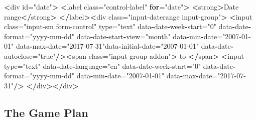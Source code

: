 \documentclass[]{article}
\newenvironment{Shaded}{\begin{snugshade}}{\end{snugshade}}
\newcommand{\ControlFlowTok}[1]{\textcolor[rgb]{0.13,0.29,0.53}{\textbf{#1}}}
\newcommand{\ErrorTok}[1]{\textcolor[rgb]{0.64,0.00,0.00}{\textbf{#1}}}
\newcommand{\NormalTok}[1]{#1}
\newcommand{\OperatorTok}[1]{\textcolor[rgb]{0.81,0.36,0.00}{\textbf{#1}}}
\newcommand{\StringTok}[1]{\textcolor[rgb]{0.31,0.60,0.02}{#1}}
\begin{document}
\begin{Shaded}
\begin{Highlighting}[]
\OperatorTok{<}\NormalTok{div id=}\StringTok{"date"}\OperatorTok{>}
\ErrorTok{<}\NormalTok{label class=}\StringTok{"control-label"} \ControlFlowTok{for}\NormalTok{=}\StringTok{"date"}\OperatorTok{>}\StringTok{ }\ErrorTok{<}\NormalTok{strong}\OperatorTok{>}\NormalTok{Date range}\OperatorTok{<}\ErrorTok{/}\NormalTok{strong}\OperatorTok{>}
\ErrorTok{</}\NormalTok{label}\OperatorTok{>}\ErrorTok{<}\NormalTok{div class=}\StringTok{"input-daterange input-group"}\OperatorTok{>}
\ErrorTok{<}\NormalTok{input class=}\StringTok{"input-sm form-control"}\NormalTok{ type=}\StringTok{"text"}
\NormalTok{data}\OperatorTok{-}\NormalTok{date}\OperatorTok{-}\NormalTok{week}\OperatorTok{-}\NormalTok{start=}\StringTok{"0"}\NormalTok{ data}\OperatorTok{-}\NormalTok{date}\OperatorTok{-}\NormalTok{format=}\StringTok{"yyyy-mm-dd"}
\NormalTok{data}\OperatorTok{-}\NormalTok{date}\OperatorTok{-}\NormalTok{start}\OperatorTok{-}\NormalTok{view=}\StringTok{"month"}\NormalTok{ data}\OperatorTok{-}\NormalTok{min}\OperatorTok{-}\NormalTok{date=}\StringTok{"2007-01-01"}
\NormalTok{data}\OperatorTok{-}\NormalTok{max}\OperatorTok{-}\NormalTok{date=}\StringTok{"2017-07-31"}\NormalTok{data}\OperatorTok{-}\NormalTok{initial}\OperatorTok{-}\NormalTok{date=}\StringTok{"2007-01-01"}
\NormalTok{data}\OperatorTok{-}\NormalTok{date}\OperatorTok{-}\NormalTok{autoclose=}\StringTok{"true"}\OperatorTok{/}\ErrorTok{><}\NormalTok{span class=}\StringTok{"input-group-addon"}\OperatorTok{>}
\NormalTok{to }\OperatorTok{<}\ErrorTok{/}\NormalTok{span}\OperatorTok{>}\StringTok{ }\ErrorTok{<}\NormalTok{input  type=}\StringTok{"text"}\NormalTok{ data}\OperatorTok{-}\NormalTok{date}\OperatorTok{-}\NormalTok{language=}\StringTok{"en"}
\NormalTok{data}\OperatorTok{-}\NormalTok{date}\OperatorTok{-}\NormalTok{week}\OperatorTok{-}\NormalTok{start=}\StringTok{"0"}\NormalTok{ data}\OperatorTok{-}\NormalTok{date}\OperatorTok{-}\NormalTok{format=}\StringTok{"yyyy-mm-dd"}
\NormalTok{data}\OperatorTok{-}\NormalTok{min}\OperatorTok{-}\NormalTok{date=}\StringTok{"2007-01-01"}\NormalTok{ data}\OperatorTok{-}\NormalTok{max}\OperatorTok{-}\NormalTok{date=}\StringTok{"2017-07-31"}\OperatorTok{/}\ErrorTok{>}
\StringTok{  }\ErrorTok{</}\NormalTok{div}\OperatorTok{>}\ErrorTok{</}\NormalTok{div}\OperatorTok{>}
\end{Highlighting}
\end{Shaded}

\hypertarget{the-game-plan}{%
\subsection{The Game Plan}\label{the-game-plan}}
\end{document}
